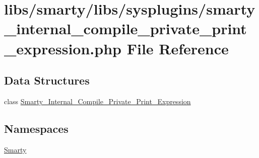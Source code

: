 \hypertarget{smarty__internal__compile__private__print__expression_8php}{}\section{libs/smarty/libs/sysplugins/smarty\+\_\+internal\+\_\+compile\+\_\+private\+\_\+print\+\_\+expression.php File Reference}
\label{smarty__internal__compile__private__print__expression_8php}
\subsection*{Data Structures}
\begin{DoxyCompactItemize}
\item 
class \hyperlink{class_smarty___internal___compile___private___print___expression}{Smarty\+\_\+\+Internal\+\_\+\+Compile\+\_\+\+Private\+\_\+\+Print\+\_\+\+Expression}
\end{DoxyCompactItemize}
\subsection*{Namespaces}
\begin{DoxyCompactItemize}
\item 
 \hyperlink{namespace_smarty}{Smarty}
\end{DoxyCompactItemize}
